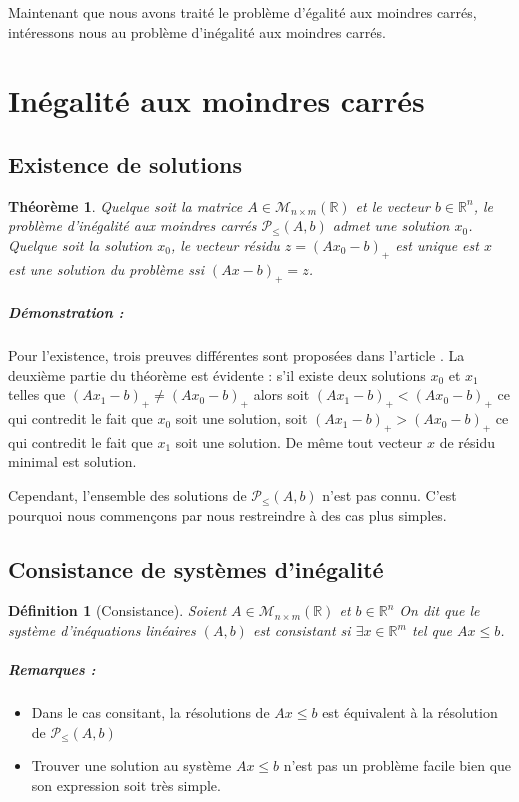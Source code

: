 \documentclass[10pt,a4paper]{article}
\newtheorem{thm}{Théorème}
\newtheorem{mydef}{Définition}
\begin{document}
Maintenant que nous avons traité le problème d'égalité aux moindres carrés, intéressons nous au problème d'inégalité aux moindres carrés.

\section{Inégalité aux moindres carrés}

\subsection{Existence de solutions}

\begin{thm}
  Quelque soit la matrice $A \in \mathcal{M}_{n \times m}(\mathbb{R})$ et le vecteur $b \in \mathbb{R}^n$, le problème d'inégalité aux moindres carrés $\mathcal{P}_{\leq}(A, b)$ admet une solution $x_0$.
  Quelque soit la solution $x_0$, le vecteur résidu $z = (Ax_0 - b)_+$ est unique est $x$ est une solution du problème ssi $(Ax - b)_+ = z$.
\end{thm}
\subparagraph{Démonstration :}
Pour l'existence, trois preuves différentes sont proposées dans l'article \cite{LSCHUP}.
La deuxième partie du théorème est évidente : s'il existe deux solutions $x_0$ et $x_1$ telles que $(Ax_1 - b)_+ \neq (Ax_0 - b)_+$ alors soit $(Ax_1 - b)_+ < (Ax_0 - b)_+$ ce qui contredit le fait que $x_0$ soit une solution, soit $(Ax_1 - b)_+ > (Ax_0 - b)_+$ ce qui contredit le fait que $x_1$ soit une solution.
De même tout vecteur $x$ de résidu minimal est solution.

Cependant, l'ensemble des solutions de $\mathcal{P}_{\leq}(A, b)$ n'est pas connu.
C'est pourquoi nous commençons par nous restreindre à des cas plus simples.

\subsection{Consistance de systèmes d'inégalité}
\begin{mydef}[Consistance]
Soient $A \in \mathcal{M}_{n \times m}(\mathbb{R})$ et $b \in \mathbb{R}^n$
On dit que le système d'inéquations linéaires $(A,b)$ est consistant si $\exists x \in \mathbb{R}^m$ tel que $Ax \le b$.
\end{mydef}
\subparagraph{Remarques :}
\begin{itemize}
  \item Dans le cas consitant, la résolutions de $Ax \leq b$ est équivalent à la résolution de $\mathcal{P}_{\leq}(A, b)$
  \item Trouver une solution au système $Ax \leq b$ n'est pas un problème facile bien que son expression soit très simple.
\end{itemize}
\end{document}
